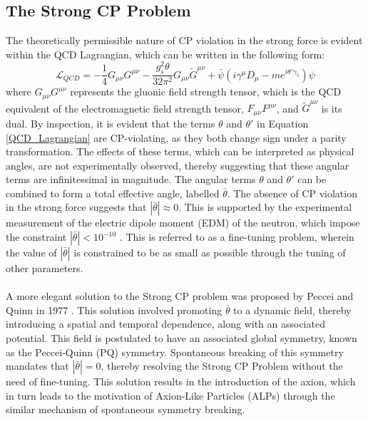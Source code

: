 \subsection{The Strong CP Problem}\label{StrongCPProb}
The theoretically permissible nature of CP violation in the strong force is evident within the QCD Lagrangian, which can be written in the following form:
\begin{equation}\label{QCD_Lagrangian}
    \mathcal{L}_{QCD} = -\frac{1}{4}G_{\mu\nu}G^{\mu\nu}-\frac{g_{s}^{2}\theta}{32\pi^{2}}G_{\mu\nu}\tilde{G}^{\mu\nu}+\bar{\psi}(i\gamma^{\mu}D_{\mu}-me^{i\theta'\gamma_{5}})\psi
\end{equation}
where $G_{\mu\nu}G^{\mu\nu}$ represents the gluonic field strength tensor, which is the QCD equivalent of the electromagnetic field strength tensor, $F_{\mu\nu}F^{\mu\nu}$, and $\tilde{G}^{\mu\nu}$ is its dual. By inspection, it is evident that the terms $\theta$ and $\theta'$ in Equation \ref{QCD_Lagrangian} are CP-violating, as they both 
change sign under a parity transformation. The effects of these terms, which can be interpreted as physical angles, are not experimentally observed, thereby suggesting that these angular terms are infinitessimal in magnitude. The angular terms $\theta$ and $\theta'$ can be combined to form a total effective angle, labelled $\bar{\theta}$. The absence
of CP violation in the strong force suggests that $|\bar{\theta}|\approx 0$. This is supported by the experimental measurement of the electric dipole moment (EDM) of the neutron, which impose the constraint $|\bar{\theta}| < 10^{-10}$ \cite{PhysRevLett.124.081803}. This is referred to as a fine-tuning problem, wherein the value of $|\bar{\theta}|$ is constrained to be as small as possible
through the tuning of other parameters.\\
\\
A more elegant solution to the Strong CP problem was proposed by Peccei and Quinn in 1977 \cite{article}. This solution involved promoting $\bar{\theta}$ to a dynamic field, thereby introducing a spatial and temporal dependence, along with an associated
potential. This field is postulated to have an associated global symmetry, known as the Peccei-Quinn (PQ) symmetry. Spontaneous breaking of this symmetry mandates that $|\bar{\theta}| = 0$, thereby resolving the Strong CP Problem without the need of fine-tuning. This solution 
results in the introduction of the axion, which in turn leads to the motivation of Axion-Like Particles (ALPs) through the similar mechanism of spontaneous symmetry breaking.
